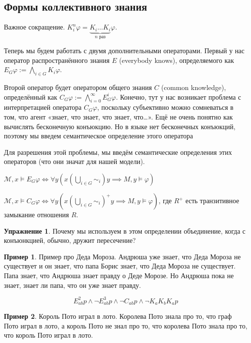 \documentclass[openany]{book}
\theoremstyle{plain}
\theoremstyle{definition}
\newtheorem{xrc}{Упражнение}[]
\newtheorem{eg}{Пример}[]
\begin{document}
\subsection{Формы коллективного знания}

Важное сокращение. \(K_i^n \varphi = \underbrace{K_i \dots K_i}_{n \text{ раз}} \varphi\).

Теперь мы будем работать с двумя дополнительными операторами. Первый у нас оператор распространённого знания \(E\) (everybody knows), определяемого как  \(E_G \varphi := \bigwedge_{i \in G} K_i \varphi\).

Второй оператор будет оператором общего знания \(C\) (common knowledge), определённый как \(C_G \varphi := \bigwedge_{i=0}^{\infty} E_G^i \varphi\). Конечно, тут у нас возникает проблема с интерпретацией оператора \(C_G \varphi\), поскольку субъективно можно сомневаться в том, что агент «знает, что знает, что знает, что\dots». Ещё не очень понятно как вычислять бесконечную конъюкцию. Но в языке нет бесконечных конъюкций, поэтому мы введем семантическое определение этого оператора

Для разрешения этой проблемы, мы введём семантические определения этих операторов (что они значат для нашей модели).

\(\mathcal{M}, x \models E_G \varphi \Leftrightarrow \forall y (x (\bigcup_{i \in G} \sim_i)y \implies M, y \models \varphi)\)

\(\mathcal{M}, x \models C_G \varphi \Leftrightarrow \forall y (x (\bigcup_{i\in G} \sim_i)^+ y \implies M,y \models \varphi)\), где \(R^+\) есть транзитивное замыкание отношения \(R\).

\begin{xrc}
    Почему мы используем в этом определении объединение, когда с конъюнкцией, обычно, дружит пересечение?
\end{xrc}

\begin{eg}
    Пример про Деда Мороза. Андрюша уже знает, что Деда Мороза не существует и он знает, что папа Борис знает, что Деда Мороза не существует. Папа знает, что Андрюша знает правду о Деде Морозе. Но Андрюша пока не знает, знает ли папа, что он уже знает правду.

    \[E^2_{ab} p \land \neg E^3_{ab} p \land \neg C_{ab} p \land \neg K_a K_b K_a p\]
\end{eg}

\begin{eg}
    Король Пото играл в лото. Королева Пото знала про то, что граф Пото играл в лото, 
    а король Пото не знал про то, что королева Пото знала про то, что король Пото играл в лото.
\end{eg}
\end{document}
